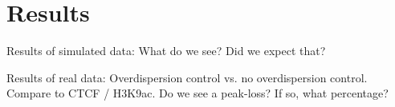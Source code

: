 \section{Results}

Results of simulated data: What do we see? Did we expect that?

Results of real data: Overdispersion control vs. no overdispersion control.
Compare to CTCF / H3K9ac. Do we see a peak-loss? If so, what percentage?